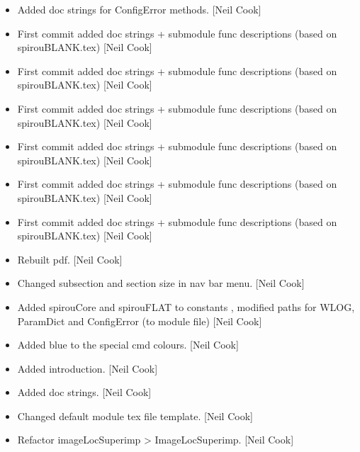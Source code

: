 \documentclass[a4paper,10pt,english]{report}
\begin{document}
\begin{itemize}
\item {} 
Added doc strings for ConfigError methods. {[}Neil Cook{]}

\item {} 
First commit \sphinxhyphen{} added doc strings + sub\sphinxhyphen{}module func descriptions (based
on spirouBLANK.tex) {[}Neil Cook{]}

\item {} 
First commit \sphinxhyphen{} added doc strings + sub\sphinxhyphen{}module func descriptions (based
on spirouBLANK.tex) {[}Neil Cook{]}

\item {} 
First commit \sphinxhyphen{} added doc strings + sub\sphinxhyphen{}module func descriptions (based
on spirouBLANK.tex) {[}Neil Cook{]}

\item {} 
First commit \sphinxhyphen{} added doc strings + sub\sphinxhyphen{}module func descriptions (based
on spirouBLANK.tex) {[}Neil Cook{]}

\item {} 
First commit \sphinxhyphen{} added doc strings + sub\sphinxhyphen{}module func descriptions (based
on spirouBLANK.tex) {[}Neil Cook{]}

\item {} 
First commit \sphinxhyphen{} added doc strings + sub\sphinxhyphen{}module func descriptions (based
on spirouBLANK.tex) {[}Neil Cook{]}

\item {} 
Rebuilt pdf. {[}Neil Cook{]}

\item {} 
Changed subsection and section size in nav bar menu. {[}Neil Cook{]}

\item {} 
Added spirouCore and spirouFLAT to constants , modified paths for
WLOG, ParamDict and ConfigError (to module file) {[}Neil Cook{]}

\item {} 
Added blue to the special cmd colours. {[}Neil Cook{]}

\item {} 
Added introduction. {[}Neil Cook{]}

\item {} 
Added doc strings. {[}Neil Cook{]}

\item {} 
Changed default module tex file template. {[}Neil Cook{]}

\item {} 
Refactor imageLocSuperimp \textendash{}\textgreater{} ImageLocSuperimp. {[}Neil Cook{]}

\end{itemize}
\end{document}
